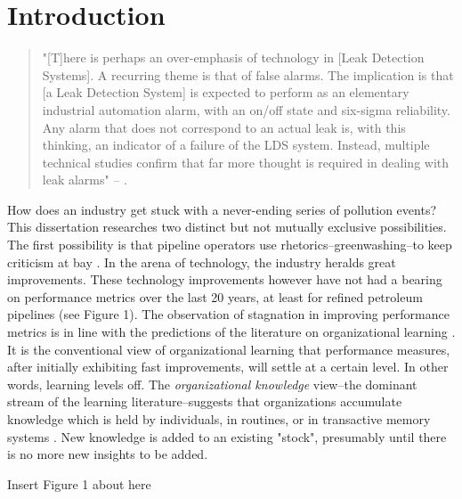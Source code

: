 \section{Introduction}

\begin{singlespace} 
	\begin{quote}
		"[T]here is perhaps an over-emphasis of technology in [Leak Detection Systems]. A recurring theme is that of false alarms. The implication is that [a Leak Detection System] is expected to perform as an elementary industrial automation alarm, with an on/off state and six-sigma reliability. Any alarm that does not correspond to an actual leak is, with this thinking, an indicator of a failure of the LDS system. Instead, multiple technical studies confirm that far more thought is required in dealing with leak alarms" -- \citet[p. 2-3]{Shaw2012}.
	\end{quote}
\end{singlespace}

How does an industry get stuck with a never-ending series of pollution events? This dissertation researches two distinct but not mutually exclusive possibilities. The first possibility is that pipeline operators use rhetorics--greenwashing--to keep criticism at bay \citep{Lyon2015}. In the arena of technology, the industry heralds great improvements. These technology improvements however have not had a bearing on performance metrics over the last 20 years, at least for refined petroleum pipelines (see Figure 1). The observation of stagnation in improving performance metrics is in line with the predictions of the literature on organizational learning \citep{Argote2013-1}. It is the conventional view of organizational learning that performance measures, after initially exhibiting fast improvements, will settle at a certain level. In other words, learning levels off. The \textit{organizational knowledge} view--the dominant stream of the learning literature--suggests that organizations accumulate knowledge which is held by individuals, in routines, or in transactive memory systems \citep{Bingham2011, Argote2011}. New knowledge is added to an existing "stock", presumably until there is no more new insights to be added.

{\noindent}\dotfill

\centerline{Insert Figure 1 about here}

{\noindent}\dotfill


